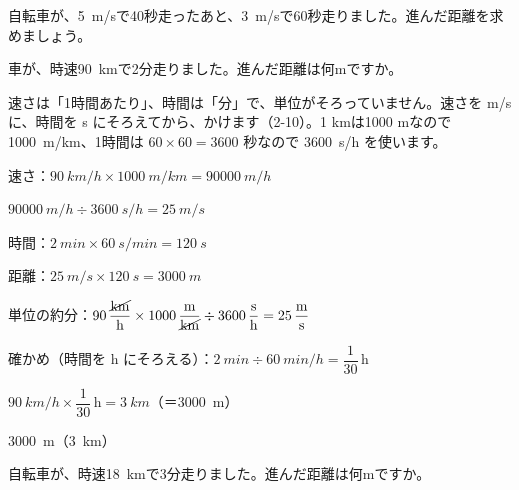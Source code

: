 \begin{jibun}
自転車が、\qty{5}{m/s}で40秒走ったあと、\qty{3}{m/s}で60秒走りました。進んだ距離を求めましょう。
\end{jibun}

\begin{reidai}[単位をそろえてから]
車が、時速\qty{90}{km}で2分走りました。進んだ距離は何mですか。\par
\kangaekata 速さは「1時間あたり」、時間は「分」で、単位がそろっていません。速さを m/s に、時間を s にそろえてから、かけます（2-10）。1 kmは1000 mなので \qty{1000}{m/km}、1時間は $60\times60=3600$ 秒なので \qty{3600}{s/h} を使います。\par
\shiki 速さ：$\qty{90}{km/h}\times\qty{1000}{m/km}=\qty{90000}{m/h}$\par
\hspace*{2.6\zw}$\qty{90000}{m/h}\div\qty{3600}{s/h}=\qty{25}{m/s}$\par
\hspace*{2.6\zw}時間：$\qty{2}{min}\times\qty{60}{s/min}=\qty{120}{s}$\par
\hspace*{2.6\zw}距離：$\qty{25}{m/s}\times\qty{120}{s}=\qty{3000}{m}$\par
\hspace*{2.6\zw}単位の約分：$90\,\dfrac{\cancel{\mathrm{km}}}{\mathrm{h}}\times1000\,\dfrac{\mathrm{m}}{\cancel{\mathrm{km}}}\div3600\,\dfrac{\mathrm{s}}{\mathrm{h}}=25\,\dfrac{\mathrm{m}}{\mathrm{s}}$\par
\hspace*{2.6\zw}確かめ（時間を h にそろえる）：$\qty{2}{min}\div\qty{60}{min/h}=\dfrac{1}{30}$\,h\par
\hspace*{2.6\zw}$\qty{90}{km/h}\times\dfrac{1}{30}\,\mathrm{h}=\qty{3}{km}$（＝\qty{3000}{m}）\par
\kotae \qty{3000}{m}（\qty{3}{km}）
\end{reidai}

\begin{jibun}
自転車が、時速\qty{18}{km}で3分走りました。進んだ距離は何mですか。
\end{jibun}

